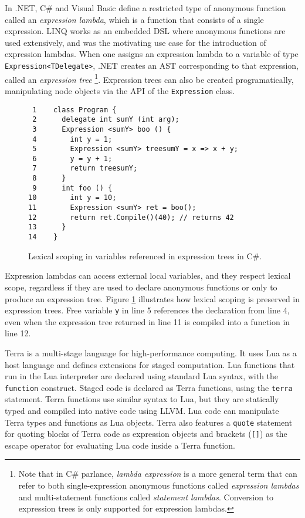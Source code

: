 \documentclass[english]{llncs}
\begin{document}
In .NET, C\# and Visual Basic define a restricted type of anonymous
function called an \emph{expression lambda}, which is a function that
consists of a single expression. LINQ works as an embedded DSL
\cite{Fowler:2010:DSL:1809745} where anonymous functions are used
extensively, and was the motivating use case for the introduction
of expression lambdas. When one assigns an expression lambda to a variable
of type \texttt{Expression<TDelegate>}, .NET creates an AST
corresponding to that expression, called an \emph{expression tree}
\footnote{Note that in C\# parlance, \emph{lambda expression} is a
more general term that can refer to both single-expression anonymous functions
called \emph{expression lambdas} and multi-statement functions called
\emph{statement lambdas}. Conversion to expression trees is only supported for
expression lambdas.}. Expression trees can also be created
programatically, manipulating node objects via the API of the
\texttt{Expression} class.

\begin{figure}[t]
\begin{verbatim}
 1    class Program {
 2      delegate int sumY (int arg);
 3      Expression <sumY> boo () {
 4        int y = 1;
 5        Expression <sumY> treesumY = x => x + y;
 6        y = y + 1;
 7        return treesumY;
 8      }
 9      int foo () {
10        int y = 10;
11        Expression <sumY> ret = boo();
12        return ret.Compile()(40); // returns 42
13      }
14    }
\end{verbatim}
\protect\caption{\label{fig:ExpressionTrees}Lexical scoping in variables
referenced in expression trees in C\#.}
\end{figure}

Expression lambdas can access external local variables, and they respect
lexical scope, regardless if they are used to declare anonymous functions or
only to produce an expression tree. Figure
\ref{fig:ExpressionTrees} illustrates how lexical scoping is preserved in
expression trees. Free variable \texttt{y} in line 5 references the declaration
from line 4, even when the expression tree returned in line 11 is compiled
into a function in line 12.

Terra \cite{DeVito2013Terra} is a multi-stage language for high-performance
computing. It uses Lua as a host language and defines extensions
for staged computation. Lua functions that run in the Lua interpreter are
declared using standard Lua syntax, with the \texttt{function} construct.
Staged code is declared as Terra functions, using the \texttt{terra}
statement. Terra functions use similar syntax to Lua, but they are statically
typed and compiled into native code using LLVM. Lua code can manipulate Terra
types and functions as Lua objects. Terra also features a \texttt{quote} statement
for quoting blocks of Terra code as expression objects and brackets
(\texttt{[]}) as the escape operator for evaluating Lua code inside a Terra
function.
\end{document}
